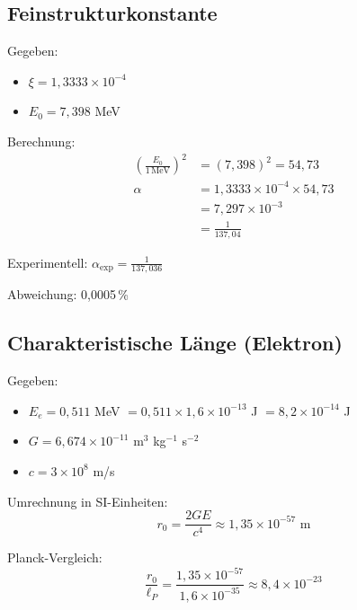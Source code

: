 	\subsection{Feinstrukturkonstante}
	
	Gegeben:
	\begin{itemize}
		\item $\xi = 1{,}3333 \times 10^{-4}$
		\item $E_0 = 7{,}398$ MeV
	\end{itemize}
	
	Berechnung:
	\begin{align}
		\left(\frac{E_0}{1\,\text{MeV}}\right)^2 &= (7{,}398)^2 = 54{,}73 \\
		\alpha &= 1{,}3333 \times 10^{-4} \times 54{,}73 \\
		&= 7{,}297 \times 10^{-3} \\
		&= \frac{1}{137{,}04}
	\end{align}
	
	Experimentell: $\alpha_{\text{exp}} = \frac{1}{137{,}036}$
	
	Abweichung: 0,0005\,\%
	
	\subsection{Charakteristische Länge (Elektron)}
	
	Gegeben:
	\begin{itemize}
		\item $E_e = 0{,}511$ MeV $= 0{,}511 \times 1{,}6 \times 10^{-13}$ J $= 8{,}2 \times 10^{-14}$ J
		\item $G = 6{,}674 \times 10^{-11}$ m$^3$ kg$^{-1}$ s$^{-2}$
		\item $c = 3 \times 10^8$ m/s
	\end{itemize}
	
	Umrechnung in SI-Einheiten:
	\begin{equation}
		r_0 = \frac{2GE}{c^4} \approx 1{,}35 \times 10^{-57} \text{ m}
	\end{equation}
	
	Planck-Vergleich:
	\begin{equation}
		\frac{r_0}{\ell_P} = \frac{1{,}35 \times 10^{-57}}{1{,}6 \times 10^{-35}} \approx 8{,}4 \times 10^{-23}
	\end{equation}
	
	
